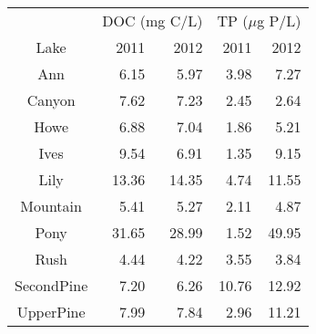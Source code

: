 \begin{table}[ht]
\centering
\begin{tabular}{crrrr}
  \hline
  & \multicolumn{2}{c}{DOC (mg C/L)} & 
                      \multicolumn{2}{c}{TP ($\mu$g P/L)} \\
 Lake & 2011 & 2012 & 2011 & 2012 \\
 \hline
Ann & 6.15 & 5.97 & 3.98 & 7.27 \\ 
  Canyon & 7.62 & 7.23 & 2.45 & 2.64 \\ 
  Howe & 6.88 & 7.04 & 1.86 & 5.21 \\ 
  Ives & 9.54 & 6.91 & 1.35 & 9.15 \\ 
  Lily & 13.36 & 14.35 & 4.74 & 11.55 \\ 
  Mountain & 5.41 & 5.27 & 2.11 & 4.87 \\ 
  Pony & 31.65 & 28.99 & 1.52 & 49.95 \\ 
  Rush & 4.44 & 4.22 & 3.55 & 3.84 \\ 
  SecondPine & 7.20 & 6.26 & 10.76 & 12.92 \\ 
  UpperPine & 7.99 & 7.84 & 2.96 & 11.21 \\ 
   \hline
\end{tabular}
\end{table}
